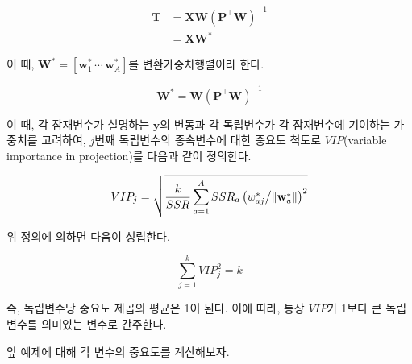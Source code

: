 \documentclass[
]{book}
\newenvironment{Shaded}{\begin{snugshade}}{\end{snugshade}}
\newcommand{\DecValTok}[1]{\textcolor[rgb]{0.00,0.00,0.81}{#1}}
\newcommand{\FunctionTok}[1]{\textcolor[rgb]{0.00,0.00,0.00}{#1}}
\newcommand{\NormalTok}[1]{#1}
\newcommand{\OtherTok}[1]{\textcolor[rgb]{0.56,0.35,0.01}{#1}}
\newcommand{\SpecialCharTok}[1]{\textcolor[rgb]{0.00,0.00,0.00}{#1}}
\begin{document}
\begin{equation}
\begin{split}
\mathbf{T} &= \mathbf{X} \mathbf{W} \left(\mathbf{P}^\top \mathbf{W}\right)^{-1}\\
&= \mathbf{X} \mathbf{W}^{*}
\end{split}
\end{equation}

이 때, \(\mathbf{W}^{*} = \left[\mathbf{w}^{*}_1 \, \cdots \, \mathbf{w}^{*}_A \right]\)를 변환가중치행렬이라 한다.

\begin{equation}
\mathbf{W}^{*} = \mathbf{W} \left(\mathbf{P}^\top \mathbf{W}\right)^{-1}
\end{equation}

이 때, 각 잠재변수가 설명하는 \(\mathbf{y}\)의 변동과 각 독립변수가 각 잠재변수에 기여하는 가중치를 고려하여, \(j\)번째 독립변수의 종속변수에 대한 중요도 척도로 \(VIP\)(variable importance in projection)를 다음과 같이 정의한다.

\begin{equation}
VIP_j = \sqrt{\frac{k}{SSR} \sum_{a = 1}^{A} SSR_a \left( w^{*}_{aj} \middle/ \| \mathbf{w}^{*}_a \|  \right)^2} \label{eq:plsr-single-vip}
\end{equation}

위 정의에 의하면 다음이 성립한다.

\[
\sum_{j = 1}^{k} VIP_j^2 = k
\]

즉, 독립변수당 중요도 제곱의 평균은 1이 된다. 이에 따라, 통상 \(VIP\)가 1보다 큰 독립변수를 의미있는 변수로 간주한다.

앞 예제에 대해 각 변수의 중요도를 계산해보자.

\begin{Shaded}
\end{Shaded}
\end{document}
